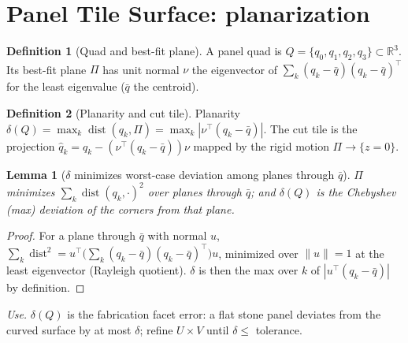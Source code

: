 \documentclass[11pt]{article}
\theoremstyle{definition}\newtheorem{definition}{Definition}[section]
\theoremstyle{plain}\newtheorem{theorem}{Theorem}[section]
\newtheorem{lemma}[theorem]{Lemma}\newtheorem{proposition}[theorem]{Proposition}
\newcommand{\R}{\mathbb{R}}\newcommand{\Z}{\mathbb{Z}}\newcommand{\Norm}[1]{\lVert #1\rVert}
\begin{document}
\section{Panel Tile Surface: planarization}
\begin{definition}[Quad and best-fit plane]
A panel quad is $Q=\{q_0,q_1,q_2,q_3\}\subset\R^3$. Its best-fit plane $\Pi$ has unit normal $\nu$ the
eigenvector of $\sum_k (q_k-\bar q)(q_k-\bar q)^\top$ for the least eigenvalue ($\bar q$ the centroid).
\end{definition}
\begin{definition}[Planarity and cut tile]
Planarity $\delta(Q)=\max_k \operatorname{dist}(q_k,\Pi)=\max_k|\nu^\top(q_k-\bar q)|$. The cut tile is the
projection $\hat q_k=q_k-(\nu^\top(q_k-\bar q))\nu$ mapped by the rigid motion $\Pi\!\to\!\{z=0\}$.
\end{definition}
\begin{lemma}[$\delta$ minimizes worst-case deviation among planes through $\bar q$]
$\Pi$ minimizes $\sum_k \operatorname{dist}(q_k,\cdot)^2$ over planes through $\bar q$; and $\delta(Q)$ is the
Chebyshev (max) deviation of the corners from that plane.
\end{lemma}
\begin{proof}
For a plane through $\bar q$ with normal $u$, $\sum_k\operatorname{dist}^2=u^\top\big(\sum_k(q_k-\bar q)(q_k-\bar q)^\top\big)u$,
minimized over $\Norm u=1$ at the least eigenvector (Rayleigh quotient). $\delta$ is then the max over $k$
of $|u^\top(q_k-\bar q)|$ by definition.
\end{proof}
\noindent\emph{Use.} $\delta(Q)$ is the fabrication facet error: a flat stone panel deviates from the
curved surface by at most $\delta$; refine $U\times V$ until $\delta\le$ tolerance.
\end{document}
